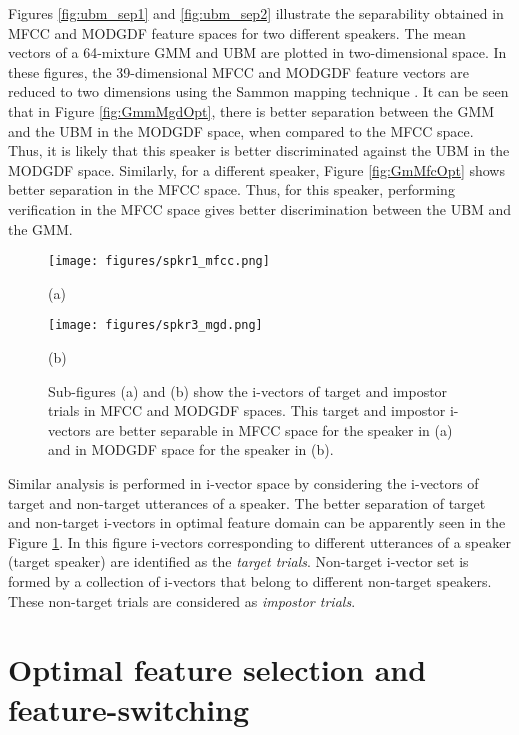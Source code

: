 \documentclass{article}
\begin{document}
Figures \ref{fig:ubm_sep1} and \ref{fig:ubm_sep2} illustrate the
separability obtained in MFCC and MODGDF feature spaces for two different
speakers. The mean vectors of a 64-mixture GMM and UBM are plotted in
two-dimensional space. In these figures, the 39-dimensional MFCC and MODGDF
feature vectors are reduced to two dimensions using the Sammon mapping technique
\cite{sammon}. It can be seen that in Figure \ref{fig:GmmMgdOpt}, there is
better separation between the GMM and the UBM in the MODGDF space, when compared
to the MFCC space. Thus, it is likely that this speaker is better discriminated
against the UBM in the MODGDF space. Similarly, for a different speaker, 
Figure \ref{fig:GmMfcOpt} shows better separation in the MFCC space. Thus,
for this speaker, performing verification in the MFCC space gives better
discrimination between the UBM and the GMM. 

\begin{figure}[h!tb]
\centering \hspace{-5cm}
\begin{minipage}{0.65\textwidth}
\centering 
\texttt{[image: figures/spkr1\_mfcc.png]}
\caption*{(a)}
\label{fig:subfig3}
\end{minipage}%
\begin{minipage}{0.25\textwidth}
\centering \hspace{10cm}
\texttt{[image: figures/spkr3\_mgd.png]}
\caption*{(b)}
\label{fig:subfig4}
\end{minipage}
\caption{Sub-figures (a) and (b) show the i-vectors of target and impostor trials in MFCC and MODGDF spaces. This target and impostor i-vectors are better separable in MFCC space for the speaker in (a) and in MODGDF space for the speaker  in (b).}
\label{fig:ivec_separation}
\end{figure}

Similar analysis is performed in i-vector space by considering the i-vectors of target and non-target utterances of a speaker. The better separation of target and non-target i-vectors in optimal feature domain can be apparently seen in the Figure \ref{fig:ivec_separation}. In this figure i-vectors corresponding to different utterances of a speaker (target speaker) are identified as the \emph{target trials}. Non-target i-vector set is formed by a collection of i-vectors that belong to different non-target speakers. These non-target trials are considered as \emph{impostor trials}. 

\section{Optimal feature selection and feature-switching}
\label{sec:optFeat}
\end{document}
